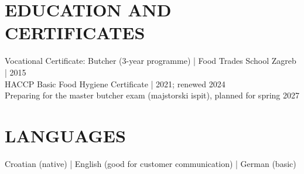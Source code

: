 \documentclass[11pt,a4paper]{article}
\begin{document}
\section*{EDUCATION AND CERTIFICATES}
Vocational Certificate: Butcher (3-year programme) | Food Trades School Zagreb | 2015\\
HACCP Basic Food Hygiene Certificate | 2021; renewed 2024\\
Preparing for the master butcher exam (majstorski ispit), planned for spring 2027

\section*{LANGUAGES}
Croatian (native) | English (good for customer communication) | German (basic)
\end{document}
